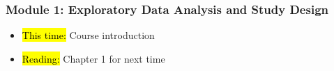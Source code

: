 
\begin{frame}
    \frametitle{Module 1: Exploratory Data Analysis and Study Design}
    \begin{itemize}
        \item \hl{This time: }Course introduction
        \item \hl{Reading: }Chapter 1 for next time
    \end{itemize}

\end{frame}
